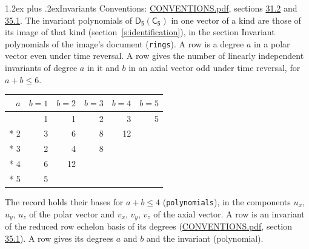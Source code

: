 \documentclass[10pt,a4paper]{article}
\makeatletter
\renewcommand\section{\@startsection{section}{1}{\z@}{-3ex plus -1ex minus -.2ex}%
  {1.2ex plus .2ex}{\normalfont\large\sffamily\bfseries\color{parttitle}}}
\numberwithin{equation}{section}
\newcommand{\grp}[1]{\mathsf{#1}}
\makeatother
\begin{document}
\section{Invariants}\label{s:invariants}
Conventions: \href{../../CONVENTIONS.pdf}{CONVENTIONS.pdf}, sections \href{../../CONVENTIONS.pdf\#conv.31.2}{31.2} and \href{../../CONVENTIONS.pdf\#conv.35.1}{35.1}.
The invariant polynomials of $\grp{D_{5}}(\grp{C_{5}})$ in one vector of a kind are those of its image of that kind (section~\ref{s:identification}), in the section Invariant polynomials of the image's document (\texttt{rings}).
\leavevmode\label{n:index.degree.polar}\label{n:index.degree.axial}A row is a degree $a$ in a polar vector even under time reversal. A row gives the number of linearly independent invariants of degree $a$ in it and $b$ in an axial vector odd under time reversal, for $a + b \le 6$.
{\small\begin{longtable}{@{}rrrrrr@{}}\toprule
$a$ & $b = 1$ & $b = 2$ & $b = 3$ & $b = 4$ & $b = 5$\\\midrule\endhead
\bottomrule\endfoot\endlastfoot
1 & 1 & 1 & 2 & 3 & 5\\*
2 & 3 & 6 & 8 & 12 & \\*
3 & 2 & 4 & 8 &  & \\*
4 & 6 & 12 &  &  & \\*
5 & 5 &  &  &  & \\
\bottomrule\end{longtable}}
\leavevmode\label{n:local.component.polar}\label{n:local.component.axial}The record holds their bases for $a + b \le 4$ (\texttt{polynomials}), in the components $u_{x}$, $u_{y}$, $u_{z}$ of the polar vector and $v_{x}$, $v_{y}$, $v_{z}$ of the axial vector. \label{n:head.polynomial}A row is an invariant of the reduced row echelon basis of its degrees (\href{../../CONVENTIONS.pdf}{CONVENTIONS.pdf}, section \href{../../CONVENTIONS.pdf\#conv.35.1}{35.1}). A row gives its degrees $a$ and $b$ and the invariant (polynomial).
\end{document}
